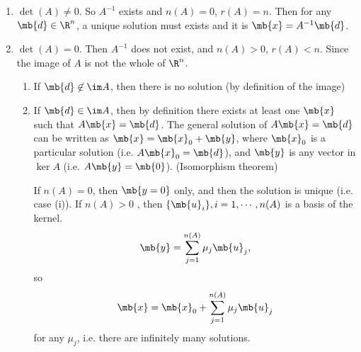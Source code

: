 \documentclass[a4paper]{article}
\begin{document}
\begin{enumerate}
\item $\det(A) \not= 0$. So $A^{-1}$ exists and $n(A) = 0$, $r(A) = n$. Then for any $\mb{d}\in \R^n$, a unique solution must exists and it is $\mb{x} = A^{-1}\mb{d}$.
\item $\det(A) = 0$. Then $A^{-1}$ does not exist, and $n(A) > 0$, $r(A) < n$. Since the image of $A$ is not the whole of $\R^n$.
  \begin{enumerate}
  \item If $\mb{d}\not\in \im A$, then there is no solution (by definition of the image)
  \item If $\mb{d}\in \im A$, then by definition there exists at least one $\mb{x}$ such that $A\mb{x} = \mb{d}$. The general solution of $A\mb{x} = \mb{d}$  can be written as $\mb{x} = \mb{x}_0 + \mb{y}$, where $\mb{x}_0$ is a particular solution (i.e. $A\mb{x}_0 = \mb{d}$), and $\mb{y}$ is any vector in $\ker A$ (i.e. $A\mb{y} = \mb{0}$). (Isomorphism theorem)

    If $n(A) = 0$, then $\mb{y = 0}$ only, and then the solution is unique (i.e. case (i)). If $n(A) > 0$ , then $\{\mb{u}_i\}, i = 1, \cdots, n(A)$ is a basis of the kernel.
\[
\mb{y} = \sum_{j = 1}^{n(A)} \mu_j \mb{u}_j,
\]
so
\[
\mb{x} = \mb{x}_0 + \sum_{j = 1}^{n(A)} \mu_j \mb{u}_j
\]
for any $\mu_j$, i.e. there are infinitely many solutions.
  \end{enumerate}
\end{enumerate}
\end{document}
